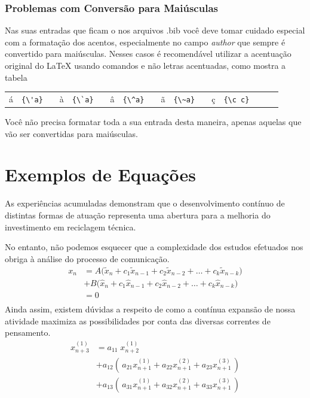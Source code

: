 \begin{apendicesenv}
    \subsection{Problemas com Conversão para Maiúsculas}

    Nas suas entradas que ficam o nos arquivos {\color{red} .bib}
    você deve tomar cuidado especial com a formatação dos acentos,
    especialmente no campo \textit{author} que sempre é convertido para maiúsculas.
    Nesses casos é recomendável utilizar a acentuação original do \LaTeX{}
    usando comandos e não letras acentuadas, como mostra a tabela

    \begin{center}
        \begin{tabular}{clcclcclcclcclccl}
            á & \verb!{\'a}! &  &
            à & \verb!{\`a}! &  &
            â & \verb!{\^a}! &  &
            ã & \verb!{\~a}! &  &
            ç & \verb!{\c c}!
        \end{tabular}
    \end{center}

    Você não precisa formatar toda a sua entrada desta maneira,
    apenas aquelas que vão ser convertidas para maiúsculas.

    \chapter{Exemplos de Equações}
    \label{chap_exemplos_equacoes}

    As experiências acumuladas demonstram que o desenvolvimento contínuo de
    distintas formas de atuação representa uma abertura para a melhoria do
    investimento em reciclagem técnica.

    No entanto, não podemos esquecer que a complexidade dos estudos efetuados nos
    obriga à análise do processo de comunicação.
    \[
        \begin{split}
            x_n & = A \big( \tilde{x}_n + c_1\tilde{x}_{n-1} + c_2\tilde{x}_{n-2} + \dots + c_k\tilde{x}_{n-k} \big) \\
            & + B \big(   \hat{x}_n + c_1  \hat{x}_{n-1} + c_2  \hat{x}_{n-2} + \dots + c_k  \hat{x}_{n-k} \big) \\
            & = 0 \\
        \end{split}
    \]
    Ainda assim, existem dúvidas a respeito de como a contínua expansão de nossa
    atividade maximiza as possibilidades por conta das diversas correntes de
    pensamento.
    \begin{equation}
        \begin{split}
            x_{n+3}^{(1)} & = a_{11}\; x_{n+2}^{(1)}                                                                  \\[2mm]
            & + a_{12} \left( \, a_{21}x_{n+1}^{(1)}+a_{22}x_{n+1}^{(2)}+a_{23}x_{n+1}^{(3)} \, \right) \\[2mm]
            & + a_{13} \left( \, a_{31}x_{n+1}^{(1)}+a_{32}x_{n+1}^{(2)}+a_{33}x_{n+1}^{(3)} \, \right)
        \end{split}
    \end{equation}


\end{apendicesenv}
